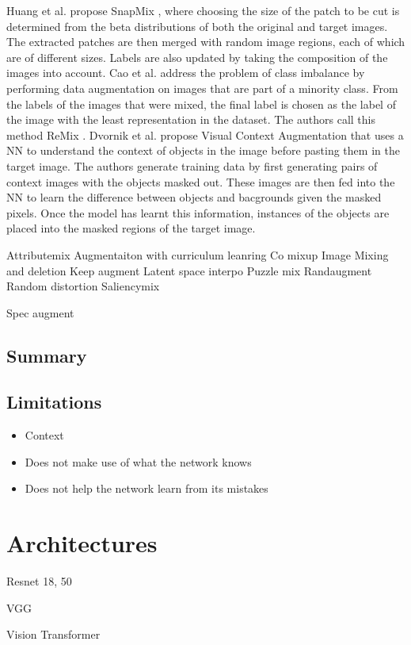 Huang et al. propose SnapMix \cite{huangSnapMixSemanticallyProportional2021}, where choosing the size of the patch to be cut is determined from the beta distributions of both the original and target images. The extracted patches are then merged with random image regions, each of which are of different sizes. Labels are also updated by taking the composition of the images into account.
Cao et al. address the problem of class imbalance by performing data augmentation on images that are part of a minority class. From the labels of the images that were mixed, the final label is chosen as the label of the image with the least representation in the dataset. The authors call this method ReMix \cite{caoReMixImagetoImageTranslation2021}.
Dvornik et al. propose Visual Context Augmentation \cite{dvornikModelingVisualContext2018} that uses a NN to understand the context of objects in the image before pasting them in the target image. The authors generate training data by first generating pairs of context images with the objects masked out. These images are then fed into the NN to learn the difference between objects and bacgrounds given the masked pixels. Once the model has learnt this information, instances of the objects are placed into the masked regions of the target image.

Attributemix
Augmentaiton with curriculum leanring
Co mixup
Image Mixing and deletion
Keep augment
Latent space interpo
Puzzle mix
Randaugment
Random distortion
Saliencymix

Spec augment



\subsection{Summary}
\subsection{Limitations}
\begin{itemize}
\item Context
\item Does not make use of what the network knows
\item Does not help the network learn from its mistakes
\end{itemize}
\section{Architectures}
Resnet 18, 50

VGG

Vision Transformer
